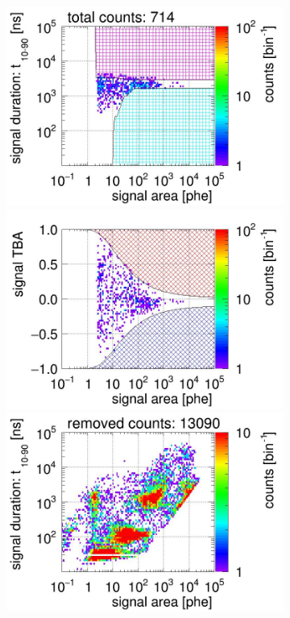 \begin{landscape}
\begin{figure}[!p]
\begin{subfigure}[t]{0.33\textwidth}
			\includegraphics[width=\figurewidth,clip,trim={0 98 0 0}]{Figures/GasTest/CutsValid/res64766/pdpa23Vecfig64766.jpg}
			\includegraphics[width=\figurewidth,clip,trim={0 98 0 40}]{Figures/GasTest/CutsValid/res64766/tbapa23Vecfig64766.jpg}
			\includegraphics[width=\figurewidth,clip,trim={0 98 0 10}]{Figures/GasTest/CutsValid/res64766/pdpaX23Vecfig64766.jpg}

\end{subfigure}
\end{figure}
\end{landscape}
